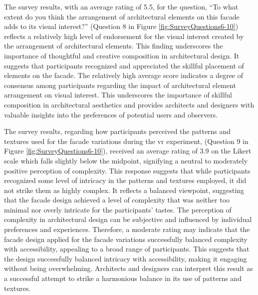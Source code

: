 
The survey results, with an average rating of 5.5, for the question, ``To what extent do you think the arrangement of architectural elements on this facade adds to its visual interest?'' (Question 8 in Figure \ref{fig:SurveyQuestions6-10}) reflects a relatively high level of endorsement for the visual interest created by the arrangement of architectural elements.
This finding underscores the importance of thoughtful and creative composition in architectural design.
It suggests that participants recognized and appreciated the skillful placement of elements on the facade.
The relatively high average score indicates a degree of consensus among participants regarding the impact of architectural element arrangement on visual interest.
This underscores the importance of skillful composition in architectural aesthetics and provides architects and designers with valuable insights into the preferences of potential users and observers.


The survey results, regarding how participants perceived the patterns and textures used for the facade variations during the vr experiment, (Question 9 in Figure \ref{fig:SurveyQuestions6-10}), received an average rating of 3.9 on the Likert scale which falls slightly below the midpoint, signifying a neutral to moderately positive perception of complexity.
This response suggests that while participants recognized some level of intricacy in the patterns and textures employed, it did not strike them as highly complex.
It reflects a balanced viewpoint, suggesting that the facade design achieved a level of complexity that was neither too minimal nor overly intricate for the participants' tastes.
The perception of complexity in architectural design can be subjective and influenced by individual preferences and experiences.
Therefore, a moderate rating may indicate that the facade design applied for the facade variations successfully balanced complexity with accessibility, appealing to a broad range of participants.
This suggests that the design successfully balanced intricacy with accessibility, making it engaging without being overwhelming.
Architects and designers can interpret this result as a successful attempt to strike a harmonious balance in its use of patterns and textures.



